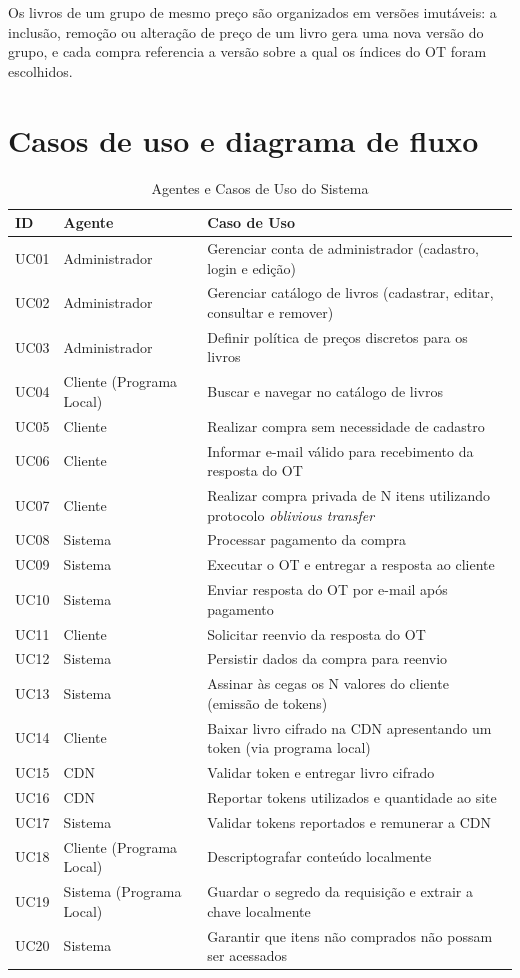 \documentclass[12pt, oneside, a4paper, english, brazil]{abntex2}
\begin{document}
Os livros de um grupo de mesmo preço são organizados em versões imutáveis: a
inclusão, remoção ou alteração de preço de um livro gera uma nova versão do
grupo, e cada compra referencia a versão sobre a qual os índices do OT foram
escolhidos.

\section{Casos de uso e diagrama de fluxo}

\begin{table}[htbp]
\centering
\caption{Agentes e Casos de Uso do Sistema}\label{tab:casos-de-uso}
\small
\begin{tabular}{@{}l l p{}@{}}
\toprule
\textbf{ID} & \textbf{Agente} & \textbf{Caso de Uso} \\
\midrule
UC01 & Administrador & Gerenciar conta de administrador (cadastro, login e edição) \\
UC02 & Administrador & Gerenciar catálogo de livros (cadastrar, editar, consultar e remover) \\
UC03 & Administrador & Definir política de preços discretos para os livros \\
UC04 & Cliente (Programa Local) & Buscar e navegar no catálogo de livros \\
UC05 & Cliente & Realizar compra sem necessidade de cadastro \\
UC06 & Cliente & Informar e-mail válido para recebimento da resposta do OT \\
UC07 & Cliente & Realizar compra privada de N itens utilizando protocolo \emph{oblivious transfer} \\
UC08 & Sistema & Processar pagamento da compra \\
UC09 & Sistema & Executar o OT e entregar a resposta ao cliente \\
UC10 & Sistema & Enviar resposta do OT por e-mail após pagamento \\
UC11 & Cliente & Solicitar reenvio da resposta do OT \\
UC12 & Sistema & Persistir dados da compra para reenvio \\
UC13 & Sistema & Assinar às cegas os N valores do cliente (emissão de tokens) \\
UC14 & Cliente & Baixar livro cifrado na CDN apresentando um token (via programa local) \\
UC15 & CDN & Validar token e entregar livro cifrado \\
UC16 & CDN & Reportar tokens utilizados e quantidade ao site \\
UC17 & Sistema & Validar tokens reportados e remunerar a CDN \\
UC18 & Cliente (Programa Local) & Descriptografar conteúdo localmente \\
UC19 & Sistema (Programa Local) & Guardar o segredo da requisição e extrair a chave localmente \\
UC20 & Sistema & Garantir que itens não comprados não possam ser acessados \\
\bottomrule
\end{tabular}
\end{table}
\end{document}
